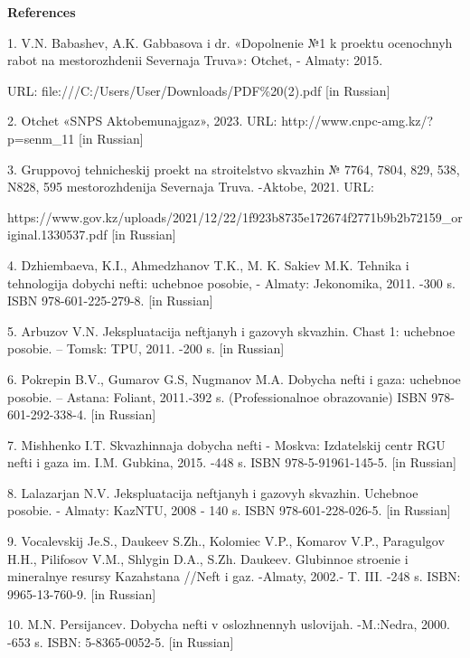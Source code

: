 \begin{center}
{\bfseries References}
\end{center}

\begin{noparindent}
1. V.N. Babashev, A.K. Gabbasova i dr. «Dopolnenie №1 k proektu
ocenochnyh rabot na mestorozhdenii Severnaja Truva»: Otchet, - Almaty:
2015.

URL: file:///C:/Users/User/Downloads/PDF\%20(2).pdf {[}in Russian{]}

2. Otchet «SNPS Aktobemunajgaz», 2023. URL:
http://www.cnpc-amg.kz/?p=senm\_11 {[}in Russian{]}

3. Gruppovoj tehnicheskij proekt na stroitel\textquotesingle stvo
skvazhin № 7764, 7804, 829, 538, N828, 595 mestorozhdenija Severnaja
Truva. -Aktobe, 2021. URL:

https://www.gov.kz/uploads/2021/12/22/1f923b8735e172674f2771b9b2b72159\_original.1330537.pdf
{[}in Russian{]}

4. Dzhiembaeva, K.I., Ahmedzhanov T.K., M. K. Sakiev M.K. Tehnika i
tehnologija dobychi nefti: uchebnoe posobie, - Almaty: Jekonomika, 2011.
-300 s. ISBN 978-601-225-279-8. {[}in Russian{]}

5. Arbuzov V.N. Jekspluatacija neftjanyh i gazovyh skvazhin.
Chast\textquotesingle{} 1: uchebnoe posobie. -- Tomsk: TPU, 2011. -200
s. {[}in Russian{]}

6. Pokrepin B.V., Gumarov G.S, Nugmanov M.A. Dobycha nefti i gaza:
uchebnoe posobie. -- Astana: Foliant, 2011.-392 s.
(Professional\textquotesingle noe obrazovanie) ISBN 978-601-292-338-4.
{[}in Russian{]}

7. Mishhenko I.T. Skvazhinnaja dobycha nefti - Moskva:
Izdatel\textquotesingle skij centr RGU nefti i gaza im. I.M. Gubkina,
2015. -448 s. ISBN 978-5-91961-145-5. {[}in Russian{]}

8. Lalazarjan N.V. Jekspluatacija neftjanyh i gazovyh skvazhin. Uchebnoe
posobie. - Almaty: KazNTU, 2008 - 140 s. ISBN 978-601-228-026-5. {[}in
Russian{]}

9. Vocalevskij Je.S., Daukeev S.Zh., Kolomiec V.P., Komarov V.P.,
Paragul\textquotesingle gov H.H., Pilifosov V.M., Shlygin D.A., S.Zh.
Daukeev. Glubinnoe stroenie i mineral\textquotesingle nye resursy
Kazahstana //Neft\textquotesingle{} i gaz. -Almaty, 2002.- T. III. -248
s. ISBN: 9965-13-760-9. {[}in Russian{]}

10. M.N. Persijancev. Dobycha nefti v oslozhnennyh uslovijah. -M.:Nedra,
2000. -653 s. ISBN: 5-8365-0052-5. {[}in Russian{]}


\end{noparindent}
